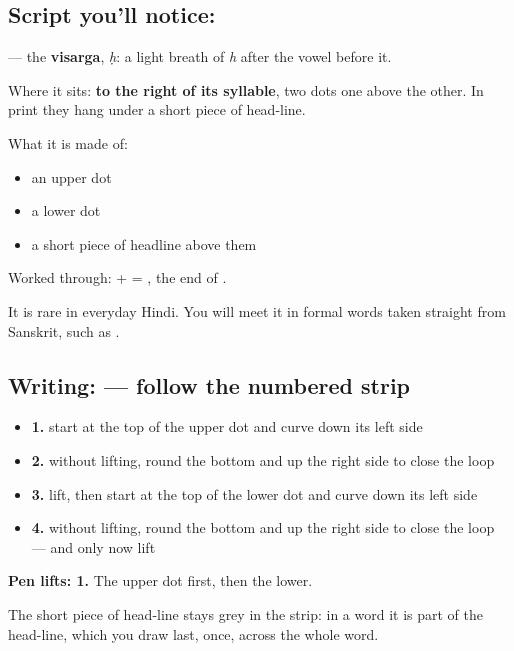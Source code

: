 \subsection*{Script you'll notice: }
\textbf{} — the \textbf{visarga}, \emph{ḥ}: a light breath of \emph{h} after the vowel before it.

Where it sits: \textbf{to the right of its syllable}, two dots one above the other. In print they hang under a short piece of head-line.

What it is made of:

\begin{itemize}
\raggedright
  \item an upper dot
  \item a lower dot
  \item a short piece of headline above them
\end{itemize}

Worked through: \textbf{} + \textbf{} = \textbf{}, the end of \textbf{}.

It is rare in everyday Hindi. You will meet it in formal words taken straight from Sanskrit, such as \textbf{}.

\subsection*{Writing:  — follow the numbered strip}

\begin{itemize}
\raggedright
  \item \textbf{1.} start at the top of the upper dot and curve down its left side
  \item \textbf{2.} without lifting, round the bottom and up the right side to close the loop
  \item \textbf{3.} lift, then start at the top of the lower dot and curve down its left side
  \item \textbf{4.} without lifting, round the bottom and up the right side to close the loop — and only now lift
\end{itemize}

\textbf{Pen lifts: 1.} The upper dot first, then the lower.

The short piece of head-line stays grey in the strip: in a word it is part of the head-line, which you draw last, once, across the whole word.

